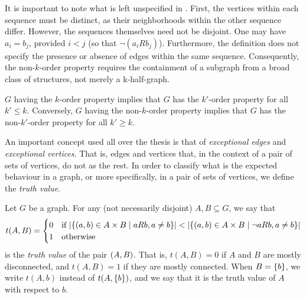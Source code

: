     \begin{remark}
        It is important to note what is left unspecified in .
        First, the vertices within each sequence must be distinct, as their neighborhoods within the other sequence
        differ.
        However, the sequences themselves need not be disjoint.
        One may have $a_i=b_j$, provided $i < j$ (so that $\neg(a_i R b_j)$).
        Furthermore, the definition does not specify the presence or absence of edges within the same sequence.
        Consequently, the non-$k$-order property requires the containment of a subgraph from a broad class of structures,
        not merely a k-half-graph.
    \end{remark}

    \begin{remark}
        $G$ having the $k$-order property implies that $G$ has the $k'$-order property for all $k' \leq k$.
        Conversely, $G$ having the non-$k$-order property implies that $G$ has the non-$k'$-order property for all $k' \geq k$.
    \end{remark}

    An important concept used all over the thesis is that of \emph{exceptional edges} and \emph{exceptional vertices}.
    That is, edges and vertices that, in the context of a pair of sets of vertices, do not  as the rest.
    In order to classify what is the expected behaviour in a graph, or more specifically, in a pair of sets of vertices,
    we define the \emph{truth value}.

    \begin{definition} \label{def:truth_value}
        Let $G$ be a graph.
        For any (not necessarily disjoint) $A, B \subseteq G$, we say that
        \[
            t(A,B) =
            \begin{cases}
                0 & \text{if } | \{ ( a, b ) \in A \times B \mid a R b, a \neq b \} | <
                    | \{ ( a, b ) \in A \times B \mid \neg a R b, a \neq b \} | \\
                1 & \text{otherwise}
            \end{cases}
        \]
        is the \emph{truth value} of the pair $( A,B )$.
        That is, $t(A,B) = 0$ if $A$ and $B$ are mostly disconnected, and $t(A,B) = 1$ if they are mostly connected.
        When $B = \{ b \}$, we write $t(A,b)$ instead of $t(A,\{ b \})$, and we say that it is the truth value of $A$
        with respect to $b$.
    \end{definition}

